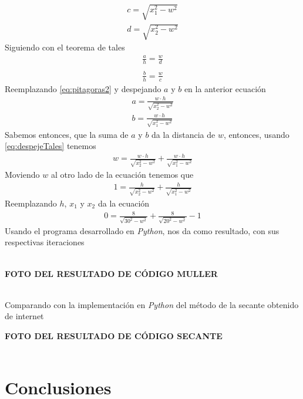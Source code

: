 \documentclass[ceqn,10pt]{SelfArx}
\begin{document}
\begin{equation} \label{eq:pitagoras2}
\begin{aligned}
	c=\sqrt{x_{1}^2-w^2}\\
	d=\sqrt{x_{2}^2-w^2}
\end{aligned}
\end{equation}
Siguiendo con el teorema de tales
\begin{equation} \label{eq:tales}
\begin{aligned}
	\frac{a}{h} = \frac{w}{d}\\
	\\
	\frac{b}{h} = \frac{w}{c}
\end{aligned}
\end{equation}
Reemplazando \ref{eq:pitagoras2} y despejando $a$ y $b$ en la anterior ecuación
\begin{equation} \label{eq:despejeTales}
\begin{aligned}
	a = \frac{w \cdot h}{\sqrt{x_{2}^2-w^2}}\\
	b = \frac{w \cdot h}{\sqrt{x_{1}^2-w^2}}
\end{aligned}
\end{equation}
Sabemos entonces, que la suma de $a$ y $b$ da la distancia de $w$, entonces,
usando \ref{eq:despejeTales} tenemos
\begin{equation} \label{eq:obtenerW}
\begin{aligned}
	w = \frac{w \cdot h}{\sqrt{x_{2}^2-w^2}} + \frac{w \cdot h}{\sqrt{x_{1}^2-w^2}}
\end{aligned}
\end{equation}
Moviendo $w$ al otro lado de la ecuación tenemos que
\begin{equation} \label{eq:ecuacionW}
\begin{aligned}
	1 = \frac{h}{\sqrt{x_{2}^2-w^2}} + \frac{h}{\sqrt{x_{1}^2-w^2}}
\end{aligned}
\end{equation}
Reemplazando $h$, $x_{1}$ y $x_{2}$ da la ecuación
\begin{equation} \label{eq:despejeW}
\begin{aligned}
	0 = \frac{8}{\sqrt{30^2-w^2}} + \frac{8}{\sqrt{20^2-w^2}}-1
\end{aligned}
\end{equation}
Usando el programa desarrollado en \emph{Python}, nos da como resultado, con sus respectivas iteraciones\\\


\textbf{FOTO DEL RESULTADO DE CÓDIGO MULLER}\\\

Comparando con la implementación en \emph{Python} del método de la secante obtenido de internet 

\textbf{FOTO DEL RESULTADO DE CÓDIGO SECANTE}\\\
\section{Conclusiones}



\end{document}
